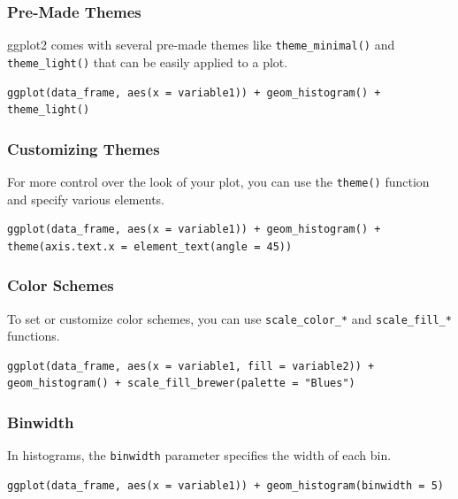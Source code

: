 \documentclass[
]{book}
\begin{document}
\subsubsection*{Pre-Made Themes}\label{pre-made-themes}

ggplot2 comes with several pre-made themes like \texttt{theme\_minimal()} and \texttt{theme\_light()} that can be easily applied to a plot.

\begin{verbatim}
ggplot(data_frame, aes(x = variable1)) + geom_histogram() + theme_light()
\end{verbatim}

\subsubsection*{Customizing Themes}\label{customizing-themes}

For more control over the look of your plot, you can use the \texttt{theme()} function and specify various elements.

\begin{verbatim}
ggplot(data_frame, aes(x = variable1)) + geom_histogram() + theme(axis.text.x = element_text(angle = 45))
\end{verbatim}

\subsubsection*{Color Schemes}\label{color-schemes}

To set or customize color schemes, you can use \texttt{scale\_color\_*} and \texttt{scale\_fill\_*} functions.

\begin{verbatim}
ggplot(data_frame, aes(x = variable1, fill = variable2)) + geom_histogram() + scale_fill_brewer(palette = "Blues")
\end{verbatim}

\subsubsection*{Binwidth}\label{binwidth}

In histograms, the \texttt{binwidth} parameter specifies the width of each bin.

\begin{verbatim}
ggplot(data_frame, aes(x = variable1)) + geom_histogram(binwidth = 5)
\end{verbatim}
\end{document}

